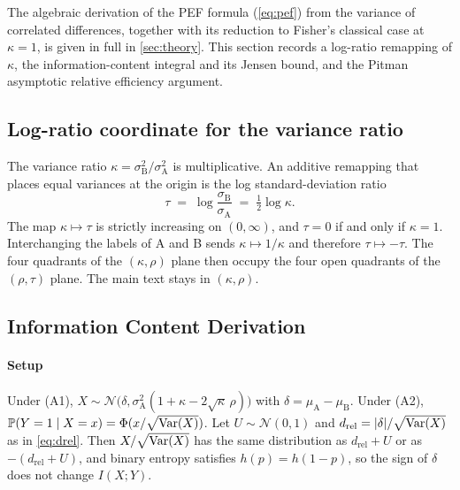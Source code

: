 \label{sec:si_note_s3}
\label{sec:appendix}

\noindent The algebraic derivation of the PEF formula (\cref{eq:pef}) from the variance of correlated differences, together with its reduction to Fisher's classical case at $\kappa=1$, is given in full in \cref{sec:theory}. This section records a log-ratio remapping of $\kappa$, the information-content integral and its Jensen bound, and the Pitman asymptotic relative efficiency argument.

\subsection*{Log-ratio coordinate for the variance ratio}
\label{sec:si_tau}

The variance ratio $\kappa=\sigma_{\mathrm{B}}^{2}/\sigma_{\mathrm{A}}^{2}$ is multiplicative. An additive remapping that places equal variances at the origin is the log standard-deviation ratio
\begin{equation}
  \tau \;=\; \log\frac{\sigma_{\mathrm{B}}}{\sigma_{\mathrm{A}}} \;=\; \tfrac12\log\kappa.
  \label{eq:tau_remap}
\end{equation}
The map $\kappa\mapsto\tau$ is strictly increasing on $(0,\infty)$, and $\tau=0$ if and only if $\kappa=1$. Interchanging the labels of A and B sends $\kappa\mapsto 1/\kappa$ and therefore $\tau\mapsto-\tau$. The four quadrants of the $(\kappa,\rho)$ plane then occupy the four open quadrants of the $(\rho,\tau)$ plane. The main text stays in $(\kappa,\rho)$.

\subsection*{Information Content Derivation}
\label{sec:si_maths_detail}

\paragraph*{Setup}

Under (A1), $X\sim\mathcal{N}\bigl(\delta,\sigma^{2}_{\mathrm{A}}(1+\kappa-2\sqrt{\kappa}\,\rho)\bigr)$ with $\delta=\mu_{\mathrm{A}}-\mu_{\mathrm{B}}$. Under (A2), $\mathbb{P}(Y=1\mid X=x)=\Phi(x/\sqrt{\operatorname{Var}(X)})$. Let $U\sim\mathcal{N}(0,1)$ and $d_{\mathrm{rel}}=|\delta|/\sqrt{\operatorname{Var}(X)}$ as in \cref{eq:drel}. Then $X/\sqrt{\operatorname{Var}(X)}$ has the same distribution as $d_{\mathrm{rel}}+U$ or as $-(d_{\mathrm{rel}}+U)$, and binary entropy satisfies $h(p)=h(1-p)$, so the sign of $\delta$ does not change $I(X;Y)$.

